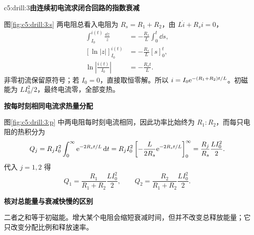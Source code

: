 \begin{drillsolution}{c5:drill:3}\textbf{由连续初电流求闭合回路的指数衰减}\par\nobreak
图\ref{fig:c5:drill:3:s} 两电阻总看入电阻为 $R_s=R_1+R_2$，由 $L\dot i+R_si=0$，
\[
\begin{aligned}
\int_{I_0}^{i(t)}\frac{\dd z}{z}&=-\frac{R_s}{L}\int_0^t\dd s,\\
[\ln|z|]_{I_0}^{i(t)}&=-\frac{R_s}{L}[s]_0^t,\\
\ln\left|\frac{i(t)}{I_0}\right|&=-\frac{R_st}{L}.
\end{aligned}
\]
非零初流保留原符号；若 $I_0=0$，直接取恒零解。所以 $i=I_0\mathrm e^{-(R_1+R_2)t/L}$。初磁能为 $LI_0^2/2$，最终电流零，全部变热。



\par\medskip{}\noindent\textbf{按每时刻相同电流求热量分配}\par\nobreak
图\ref{fig:c5:drill:3:p} 中两电阻每时刻电流相同，因此功率比始终为 $R_1:R_2$，而每只电阻的热积分为
\[
Q_j=R_jI_0^2\int_0^\infty\mathrm e^{-2R_st/L}\mathop{}\!\mathrm d t
=R_jI_0^2\left[-\frac L{2R_s}\mathrm e^{-2R_st/L}\right]_0^\infty
=\frac{R_j}{R_s}\frac{LI_0^2}{2}.
\]
代入 $j=1,2$ 得
\[
 Q_1=\frac{R_1}{R_1+R_2}\frac{LI_0^2}{2},\qquad
 Q_2=\frac{R_2}{R_1+R_2}\frac{LI_0^2}{2}.
\]


\par\medskip{}\noindent\textbf{核对总能量与衰减快慢的区别}\par\nobreak
二者之和等于初磁能。增大某个电阻会缩短衰减时间，但并不改变总释放能量；它只改变分配比例和释放速率。\end{drillsolution}
